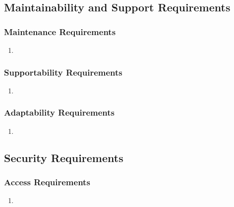 \documentclass[]{article}
\begin{document}

\subsection{Maintainability and Support Requirements}
\label{sub:maintainability_and_support_requirements}

\subsubsection{Maintenance Requirements}
\label{ssub:maintenance_requirements}
\begin{enumerate}[{MS}1. ]
	\item 
\end{enumerate}

\subsubsection{Supportability Requirements}
\label{ssub:supportability_requirements}
\begin{enumerate}[{MS}1. ]
	\item 
\end{enumerate}

\subsubsection{Adaptability Requirements}
\label{ssub:adaptability_requirements}
\begin{enumerate}[{MS}1. ]
	\item 
\end{enumerate}


\subsection{Security Requirements}
\label{sub:security_requirements}

\subsubsection{Access Requirements}
\label{ssub:access_requirements}
\begin{enumerate}[{SR}1. ]
	\item 
\end{enumerate}
\end{document}
